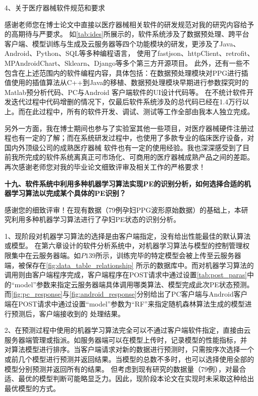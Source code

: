4、关于医疗器械软件规范和要求

感谢老师您在博士论文中直接以医疗器械相关软件的研发规范对我的研究内容给予的高期待与严要求。
如\autoref{tab:ides}所展示的，软件系统涉及了数据预处理、跨平台客户端、模型训练与生成及云服务器等四个功能模块的研发，更涉及了Java、Android、Python、SQL等多种编程语言，
使用了fastjson、httpClient、retrofit、MPAndroidChart、Sklearn、Django等多个第三方开源项目。
此外，还有一些不包含在上述范围内的软件编程内容，具体包括：在数据预处理模块对PPG进行插值使用的插值算法从C++到Java的移植、数据预处理模块早期进行参数探究时的Matlab预分析代码、PC与Android
客户端软件的UI设计代码等。
在不统计软件开发迭代过程中代码增删的情况下，仅最后软件系统涉及的总代码已经在1.4万行以上。而在此过程中，所有的软件开发、调试、测试等工作全部由我本人独立完成。

另外一方面，我在博士期间也参与了实验室其他一些项目，对医疗器械硬件注册过程也有一定的了解；而在系统研发过程中，也使用了多款专业的临床医疗设备，对国内外顶级公司的成熟医疗器械
软件也有一定的使用经验。我也深深感受到了目前我所完成的软件系统离真正可市场化、可商用的医疗器械成熟产品之间的差距。
再次感谢老师您对我的毕业论文细致评审及相关工作的严格要求！

\textbf{十九、软件系统中利用多种机器学习算法实现PE的识别分析，如何选择合适的机器学习算法以完成某个具体的PE识别？}

感谢您的细致评审！在现有数据（79例孕妇PPG波形原始数据）的基础上，本研究利用多种机器学习算法进行了孕妇PE状态的识别分析。

1、现阶段对机器学习算法的选择是由客户端指定，没有给出性能最佳的默认算法或模型。
在第六章设计的软件分析系统中，对机器学习算法与模型的控制管理权限集中在云服务器端。如$P139$所示，训练完毕的特定模型会被上传至云服务器端，被保存在\autoref{fig:data_table_relationship}
所示的数据库中。而对机器学习算法的调用则由客户端程序完成，客户端程序在POST请求中通过设置\autoref{tab:post_paras}中的“model”参数来指定云服务器端具体调用哪类算法、模型完成此次PE状态预测。
而\autoref{fig:pc_response}与\autoref{fig:android_response}分别给出了PC客户端与Android客户端在POST请求中通过设置“model”参数为“RF”来指定随机森林算法生成的模型进行预测后，客户端接收到的
处理结果。

2、在预测过程中使用的机器学习算法完全可以不通过客户端软件指定，直接由云服务器端管理或指派。如服务器端可以在模型上传时，记录模型的性能指标，并
对算法模型进行排序。当客户端请求对新的数据进行预测时，只需按序次选择一个或前几个模型进行预测并返回结果。当模型的总数不多时，也可以选择使用全部的模型分别预测并返回所有的结果。
但考虑到现有研究的数据量（79例），对最合适、最优的模型判断可能略显乏力。因此，现阶段本论文在实现时未采取这种给出最优模型的方式。

